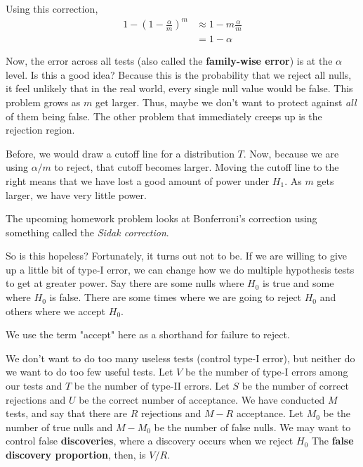 \documentclass[titlepage, 12pt, leqno]{article}
\begin{document}
Using this correction,
\begin{align*}
    1 - \left(1 - \frac{\alpha}{m}\right)^{m}
    &\approx 1 - m\frac{\alpha}{m} \\
    &= 1 - \alpha
\end{align*}

Now, the error across all tests (also called the \textbf{family-wise error}) is
at the $\alpha$ level. Is this a good idea? Because this is the probability that
we reject all nulls, it feel unlikely that in the real world, every single null
value would be false. This problem grows as $m$ get larger. Thus, maybe we don't
want to protect against \textit{all} of them being false. The other problem that
immediately creeps up is the rejection region.

Before, we would draw a cutoff line for a distribution $T$. Now, because we
are using $\alpha/m$ to reject, that cutoff becomes larger. Moving the cutoff
line to the right means that we have lost a good amount of power under $H_{1}$.
As $m$ gets larger, we have very little power.

\begin{note}
    The upcoming homework problem looks at Bonferroni's correction using 
    something called the \textit{Sidak correction}.
\end{note}

So is this hopeless? Fortunately, it turns out not to be. If we are willing to
give up a little bit of type-I error, we can change how we do multiple
hypothesis tests to get at greater power. Say there are some nulls where $H_{0}$
is true and some where $H_{0}$ is false. There are some times where we are
going to reject $H_{0}$ and others where we accept $H_{0}$. 

\begin{note}
    We use the term "accept" here as a shorthand for failure to reject.
\end{note}

We don't want to do too many useless tests (control type-I error), but neither
do we want to do too few useful tests. Let $V$ be the number of type-I errors
among our tests and $T$ be the number of type-II errors. Let $S$ be the number
of correct rejections and $U$ be the correct number of acceptance. We have
conducted $M$ tests, and say that there are $R$ rejections and $M-R$ acceptance.
Let $M_{0}$ be the number of true nulls and $M - M_{0}$ be the number of false
nulls. We may want to control false \textbf{discoveries}, where a discovery 
occurs when we reject $H_0$ The \textbf{false discovery proportion}, then, is 
$V/R$.
\end{document}
